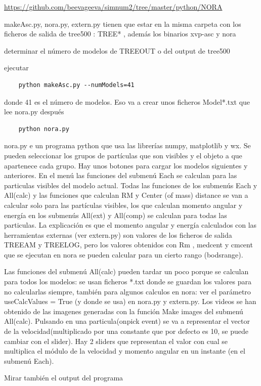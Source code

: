 \documentclass[12pt]{article} %
\renewcommand{\=}[1]{\stackrel{#1}{=}} %
\theoremstyle{definition}
\theoremstyle{remark}
\begin{document}
\begin{description}
\item \url{https://github.com/beevageeva/simnum2/tree/master/python/NORA}
\item makeAsc.py, nora.py, extern.py tienen que estar en la misma carpeta con los ficheros de salida de tree500 : TREE* , además los binarios xvp-asc y nora
\item determinar el número de modelos de TREEOUT o del output de tree500
\item ejecutar 
\begin{verbatim}
	python makeAsc.py --numModels=41
\end{verbatim}
\item donde 41 es el número de modelos. Eso va a crear unos ficheros Model*.txt  que lee nora.py después
\begin{verbatim}
	python nora.py
\end{verbatim}
\item nora.py e un programa python que usa las librerías numpy, matplotlib y wx.
Se pueden seleccionar los grupos de partículas que son visibles y el objeto a que apartenece cada grupo.
Hay unos botones para cargar los modelos siguientes y anteriores.  
En el menú las funciones del submenú Each se calculan para las particulas visibles del modelo actual. 
Todas las funciones de los submenús  Each y All(calc) y  las funciones que calculan RM y Center (of mass) distance se van a  calcular solo para las partículas visibles, los que calculan momento angular y energía en los submenús All(ext) y All(comp)  se calculan para todas las particulas. 
La explicación es que el momento angular y energía calculados con las herramientas externas (ver extern.py) 
son valores de los ficheros de salida TREEAM y TREELOG, pero los valores obtenidos con Rm , 
medcent y cmcent que se ejecutan en nora se pueden calcular para un cierto rango (bodsrange). 

Las funciones del submenú All(calc) pueden tardar un poco porque se calculan para todos los modelos: se usan ficheros *.txt donde se guardan los valores para no calcularlas siempre, también para algunos calculos en nora: ver el parámetro useCalcValues = True  (y donde se usa) en nora.py y extern.py. 
Los videos se han obtenido de las imagenes generadas con la función Make images del submenú All(calc).
Pulsando en una particula(onpick event) se va a representar el vector de la velocidad(multiplicado por una constante que por defecto es 10, se puede cambiar con el slider).
Hay 2 sliders que representan el valor con cual se multiplica el módulo de la velocidad y momento angular en un instante (en el submenú Each).

Mirar también el output del programa

\end{description}
\end{document}
